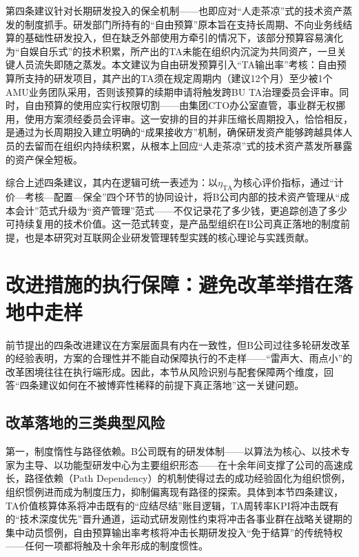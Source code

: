 第四条建议针对长期研发投入的保全机制——也即应对“人走茶凉”式的技术资产蒸发的制度抓手。研发部门所持有的“自由预算”原本旨在支持长周期、不向业务线结算的基础性研发投入，但在缺乏外部使用方牵引的情况下，该部分预算容易演化为“自娱自乐式”的技术积累，所产出的TA未能在组织内沉淀为共同资产，一旦关键人员流失即随之蒸发。本文建议为自由研发预算引入“TA输出率”考核：自由预算所支持的研发项目，其产出的TA须在规定周期内（建议12个月）至少被1个AMU业务团队采用，否则该预算的续期申请将触发跨BU TA治理委员会评审。同时，自由预算的使用应实行权限切割——由集团CTO办公室直管，事业群无权挪用，使用方案须经委员会评审。这一安排的目的并非压缩长周期投入，恰恰相反，是通过为长周期投入建立明确的“成果接收方”机制，确保研发资产能够跨越具体人员的去留而在组织内持续积累，从根本上回应“人走茶凉”式的技术资产蒸发所暴露的资产保全短板。

综合上述四条建议，其内在逻辑可统一表述为：以$\eta_{\mathrm{TA}}$为核心评价指标，通过“计价—考核—配置—保全”四个环节的协同设计，将B公司内部的技术资产管理从“成本会计”范式升级为“资产管理”范式——不仅记录花了多少钱，更追踪创造了多少可持续复用的技术价值。这一范式转变，是产品型组织在B公司真正落地的制度前提，也是本研究对互联网企业研发管理转型实践的核心理论与实践贡献。

\section{改进措施的执行保障：避免改革举措在落地中走样}
\label{sec:execution-safeguards}

前节提出的四条改进建议在方案层面具有内在一致性，但B公司过往多轮研发改革的经验表明，方案的合理性并不能自动保障执行的不走样——“雷声大、雨点小”的改革困境往往在执行端形成。因此，本节从风险识别与配套保障两个维度，回答“四条建议如何在不被博弈性稀释的前提下真正落地”这一关键问题。

\subsection{改革落地的三类典型风险}
\label{subsec:execution-risks}

第一，制度惰性与路径依赖。B公司既有的研发体制——以算法为核心、以技术专家为主导、以功能型研发中心为主要组织形态——在十余年间支撑了公司的高速成长，路径依赖（Path Dependency）\cite{david1985clio}的机制使得过去的成功经验固化为组织惯例，组织惯例进而成为制度压力，抑制偏离现有路径的探索。具体到本节四条建议，TA价值核算体系将冲击既有的“应结尽结”账目逻辑，TA周转率KPI将冲击既有的“技术深度优先”晋升通道，运动式研发刚性约束将冲击各事业群在战略关键期的集中动员惯例，自由预算输出率考核将冲击长期研发投入“免于结算”的传统特权——任何一项都将触及十余年形成的制度惯性。

